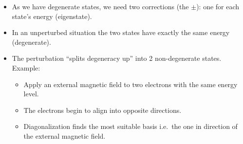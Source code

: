 \newpar{}
\begin{itemize}
    \item As we have degenerate states, we need two corrections (the $\pm$): one for each state's energy (eigenstate).
    \item In an unperturbed situation the two states have exactly the same energy (degenerate).
    \item The perturbation ``splits degeneracy up'' into 2 non-degenerate states. Example:
    \begin{itemize}
        \item Apply an external magnetic field to two electrons with the same energy level.
        \item The electrons begin to align into opposite directions.     %
        \item Diagonalization finds the most suitable basis i.e.\ the one in direction of the external magnetic field.
    \end{itemize}
\end{itemize}

